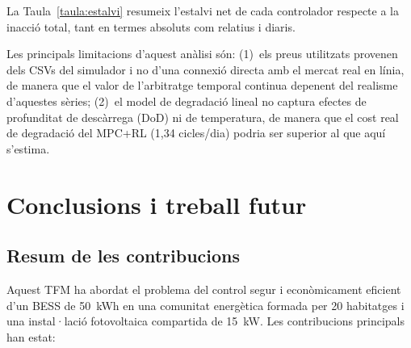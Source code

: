 \documentclass[a4paper,12pt,twoside]{ThesisStyle}
\begin{document}
La Taula~\ref{taula:estalvi} resumeix l'estalvi net de cada controlador respecte a la inacció total, tant en termes absoluts com relatius i diaris.

\begin{table}[htb]
\centering
{}%
\caption{Estalvi net sobre el conjunt de test complet (1.460 dies) respecte al MPC(H=1).}
\label{taula:estalvi}
\end{table}

Les principals limitacions d'aquest anàlisi són: (1)~els preus utilitzats provenen dels CSVs del simulador i no d'una connexió directa amb el mercat real en línia, de manera que el valor de l'arbitratge temporal continua depenent del realisme d'aquestes sèries; (2)~el model de degradació lineal no captura efectes de profunditat de descàrrega (DoD) ni de temperatura, de manera que el cost real de degradació del MPC+RL (1,34 cicles/dia) podria ser superior al que aquí s'estima.


\chapter{Conclusions i treball futur}
\label{cap:concl}

\section{Resum de les contribucions}

Aquest TFM ha abordat el problema del control segur i econòmicament eficient d'un BESS de 50~kWh en una comunitat energètica formada per 20 habitatges i una instal·lació fotovoltaica compartida de 15~kW. Les contribucions principals han estat:
\end{document}
